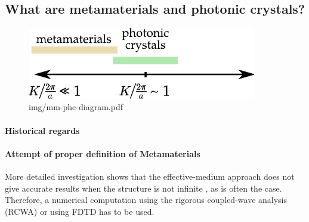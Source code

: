 \subsection{What are metamaterials and photonic crystals?} 
\begin{figure} \caption{img/mm-phc-diagram.pdf}  \centering \includegraphics[width=10cm]{img/mm-phc-diagram.pdf} \end{figure} \clearpage


\paragraph{Historical regards}
\paragraph{Attempt of proper definition of Metamaterials}
\cite{richter1995}
\cite{kadlec2008}

More detailed investigation shows that the effective-medium approach does not give accurate results when the structure is not infinite \cite{richter1995}, as is often the case. Therefore, a numerical computation using the rigorous coupled-wave analysis (RCWA) or using FDTD has to be used.


